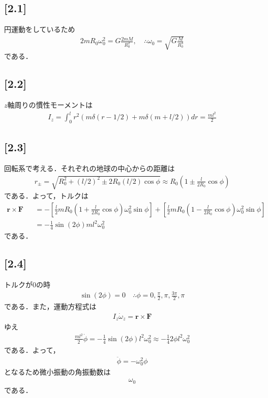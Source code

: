 \documentclass[12pt,dvipdfmx]{jsarticle}
\begin{document}
\subsection*{\large{[2.1]}}
円運動をしているため
\begin{eqnarray}
  2mR_0 \omega_0^2 = G\frac{2mM}{R_0^2}, \quad\therefore \omega_0 = \sqrt{ G\frac{M}{R_0^3} }
\end{eqnarray}
である．
\subsection*{\large{[2.2]}}
$z$軸周りの慣性モーメントは
\begin{eqnarray}
  I_z = \int_0^{l}r^2\left( m\delta(r-1/2) + m\delta(m+l/2) \right)dr =\frac{ml^2}{2}
\end{eqnarray}
\subsection*{\large{[2.3]}}

回転系で考える．それぞれの地球の中心からの距離は
\begin{eqnarray}
  r_{\pm} = \sqrt{ R_0^2 + (l/2)^2 \pm 2R_0 (l/2)\cos\phi } \approx R_0 \left( 1 \pm \frac{l}{2R_0}\cos\phi \right)
\end{eqnarray}
である．よって，トルクは
\begin{eqnarray}
  \bm{r}\times \bm{F} &&= -\left[ \frac{l}{2}mR_0 \left( 1 + \frac{l}{2R_0}\cos\phi \right)\omega_0^2 \sin\phi  \right]+\left[ \frac{l}{2}mR_0 \left( 1 - \frac{l}{2R_0}\cos\phi \right)\omega_0^2 \sin\phi  \right]\\
  &&= -\frac{1}{4}\sin(2\phi)m l^2\omega_0^2
\end{eqnarray}
である．
\subsection*{\large{[2.4]}}
トルクが$0$の時
\begin{eqnarray}
  \sin(2\phi)= 0\quad\therefore \phi=0,\frac{\pi}{2},\pi,\frac{3\pi}{2},\pi
\end{eqnarray}
である．また，運動方程式は
\begin{eqnarray}
  I_z \dot{\omega}_z = \bm{r}\times \bm{F}
\end{eqnarray}
ゆえ
\begin{eqnarray}
  \frac{ml^2}{2} \dot{\phi} = -\frac{1}{4}\sin(2\phi) l^2\omega_0^2 \approx -\frac{1}{4}2\phi l^2\omega_0^2
\end{eqnarray}
である．よって，
\begin{eqnarray}
  \ddot{\phi} = -\omega_0^2 \phi
\end{eqnarray}
となるため微小振動の角振動数は
\begin{eqnarray}
  \omega_0
\end{eqnarray}
である．
\end{document}
